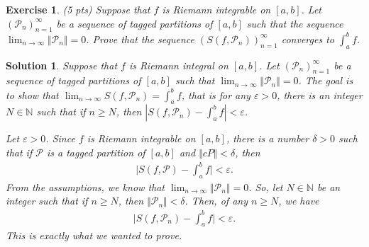 \documentclass[12pt]{article}
\newcommand{\bN}{\mathbb{N}}
\newcommand{\cP}{\mathcal{P}}
\newcommand{\ra}{\rightarrow}
\theoremstyle{plain}
\newtheorem{exer}{\textbf{Exercise}}}
\theoremstyle{plain}
\newtheorem*{sol}{\textbf{Solution}}}
\theoremstyle{plain}
\theoremstyle{plain}
\begin{document}
\begin{exer}
(5 pts)
Suppose that $f$ is Riemann integrable on $[a, b]$. Let $( \cP_n )_{n =1}^\infty$ be a sequence of tagged partitions of $[a, b]$ such that the sequence $\lim_{n \ra \infty} \Vert \cP_n \Vert = 0$. Prove that the sequence $( S (f , \cP_n ))_{n = 1}^\infty$ converges to $\int_a^b f$.
\end{exer}
\begin{sol}
Suppose that $f$ is Riemann integral on $[a, b]$. Let $(\cP_n )_{n = 1}^\infty$ be a sequence of tagged partitions of $[a, b]$ such that $\lim_{n \ra \infty} \Vert \cP_n \Vert = 0$. The goal is to show that $\lim_{n \ra \infty} S (f , \cP_n ) = \int_a^b f$, that is for any $\varepsilon > 0$, there is an integer $N \in \bN$ such that if $n \geq N$, then $|S (f, \cP_n ) - \int_a^b f| < \varepsilon$.

Let $\varepsilon > 0$. Since $f$ is Riemann integrable on $[a, b]$, there is a number $\delta > 0$ such that if $\cP$ is a tagged partition of $[a, b]$ and $\Vert cP \Vert < \delta$, then
	\begin{align*}
	\Big| S (f , \cP ) - \int_a^b f \Big| < \varepsilon .
	\end{align*}
From the assumptions, we know that $\lim_{n \ra \infty} \Vert \cP_n \Vert = 0$. So, let $N \in \bN$ be an integer such that if $n \geq N$, then $\Vert \cP_n \Vert < \delta$. Then, of any $n \geq N$, we have
	\begin{align*}
	\Big| S (f, \cP_n ) - \int_a^b f \Big| < \varepsilon .
	\end{align*}
This is exactly what we wanted to prove. 
\end{sol}
\end{document}
